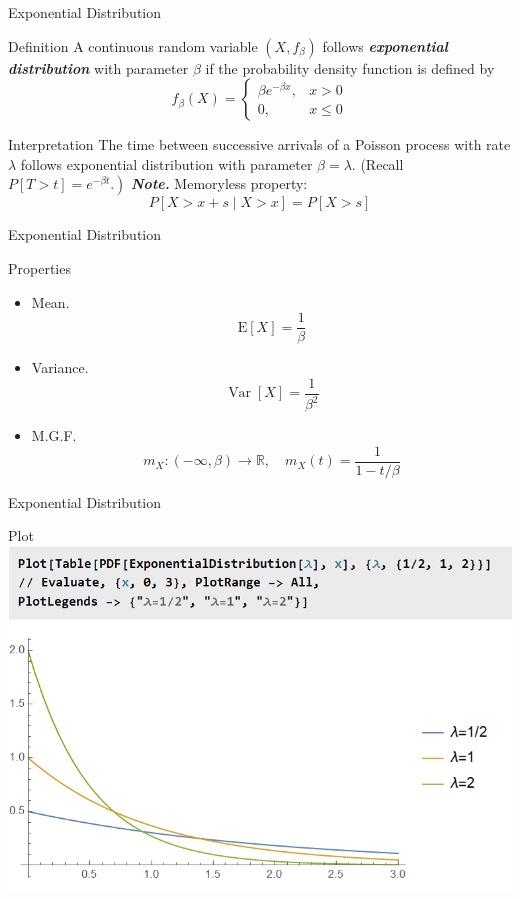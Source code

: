 \documentclass{beamer}
\newcommand{\bb}[1]{\textcolor{antiquefuchsia}{\textbf{\textit{#1}}}}
\begin{document}
\begin{frame}{Exponential Distribution}
\begin{block}{Definition}
A continuous random variable $\left(X, f_{\beta}\right)$ follows \bb{exponential distribution} with parameter $\beta$ if the probability density function is defined by
$$
f_{\beta}(X)= \begin{cases}\beta e^{-\beta x}, & x>0 \\ 0, & x \leq 0\end{cases}
$$
\end{block}
\begin{block}{Interpretation}
The time between successive arrivals of a Poisson process with rate $\lambda$ follows exponential distribution with parameter $\beta=\lambda$. (Recall $\left.P[T>t]=e^{-\beta t} .\right)$
\bb{Note.} Memoryless property:
$$
P[X>x+s \mid X>x]=P[X>s]
$$
\end{block}
\end{frame}

\begin{frame}{Exponential Distribution}
\begin{block}{Properties}
\begin{itemize}
\item Mean.
$$
\mathrm{E}[X]=\frac{1}{\beta}
$$
\item Variance. 
$$
\operatorname{Var}[X]=\frac{1}{\beta^{2}}
$$
\item M.G.F.
$$
m_{X}:(-\infty, \beta) \rightarrow \mathbb{R}, \quad m_{X}(t)=\frac{1}{1-t / \beta}
$$
\end{itemize}
\end{block}
\end{frame}

\begin{frame}{Exponential Distribution}
\begin{block}{Plot}
\includegraphics[scale=0.5]{plot.png}
\end{block}
\end{frame}
\end{document}
